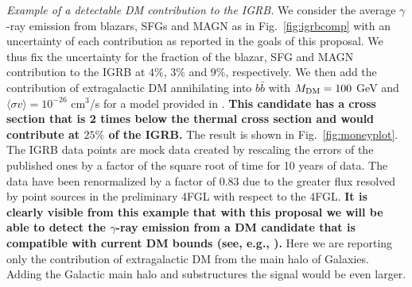 \documentclass[12 pt]{article}
\begin{document}
{\it Example of a detectable DM contribution to the IGRB.}
We consider the average $\gamma$-ray emission from blazars, SFGs and MAGN as in Fig.~\ref{fig:igrbcomp} with an uncertainty of each contribution as reported in the goals of this proposal. We thus fix the uncertainty for the fraction of the blazar, SFG and MAGN contribution to the IGRB at $4\%$, $3\%$ and $9\%$, respectively.
We then add the contribution of extragalactic DM annihilating into $b\bar{b}$ with $M_{\rm{DM}}=100$ GeV and $\langle \sigma v \rangle = 10^{-26}$ cm$^3$/s for a model provided in \cite{Cirelli:2010xx}. 
{\bf This candidate has a cross section that is 2 times below the thermal cross section and would contribute at $25\%$ of the IGRB.}
The result is shown in Fig.~\ref{fig:moneyplot}. The IGRB data points are mock data created by rescaling the errors of the published ones \cite{Ackermann:2014usa} by a factor of the square root of time for 10 years of data. The data have been renormalized by a factor of 0.83 due to the greater flux resolved by point sources in the preliminary 4FGL with respect to the 4FGL.
{\bf It is clearly visible from this example that with this proposal we will be able to detect the $\gamma$-ray emission from a DM candidate that is compatible with current DM bounds (see, e.g., \cite{Fermi-LAT:2016uux}).} Here we are reporting only the contribution of extragalactic DM from the main halo of Galaxies. Adding the Galactic main halo and substructures the signal would be even larger.



\end{document}
